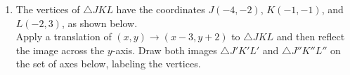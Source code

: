 \documentclass[12pt, twoside]{article}
\begin{document}
\begin{enumerate}
  \item The vertices of $\triangle JKL$ have the coordinates $J(-4,-2)$, $K(-1,-1)$, and $L(-2,3)$, as shown below. \\[0.5cm]
  Apply a translation of $(x,y) \rightarrow (x-3, y+2)$ to $\triangle JKL$ and then reflect the image across the $y$-axis. Draw both images $\triangle J'K'L'$ and $\triangle J''K''L''$ on the set of axes below, labeling the vertices.  \vspace{3cm}
  \begin{center}
  \end{center}

\end{enumerate}
\end{document}
